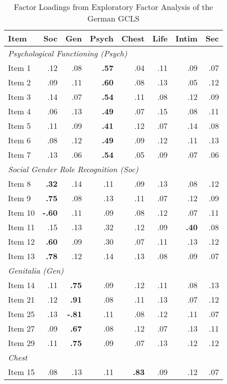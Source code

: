 \documentclass[12pt,a4paper]{article}
\begin{document}
\begin{table}[htbp]
\centering
\caption{Factor Loadings from Exploratory Factor Analysis of the German GCLS}
\begin{tabular}{lrrrrrrr}
\toprule
Item & Soc & Gen & Psych & Chest & Life & Intim & Sec\\
\midrule
\multicolumn{8}{l}{\textit{Psychological Functioning (Psych)}}\\
Item 1 & .12 & .08 & \textbf{.57} & .04 & .11 & .09 & .07\\
Item 2 & .09 & .11 & \textbf{.60} & .08 & .13 & .05 & .12\\
Item 3 & .14 & .07 & \textbf{.54} & .11 & .08 & .12 & .09\\
Item 4 & .06 & .13 & \textbf{.49} & .07 & .15 & .08 & .11\\
Item 5 & .11 & .09 & \textbf{.41} & .12 & .07 & .14 & .08\\
Item 6 & .08 & .12 & \textbf{.49} & .09 & .12 & .11 & .13\\
Item 7 & .13 & .06 & \textbf{.54} & .05 & .09 & .07 & .06\\
\midrule
\multicolumn{8}{l}{\textit{Social Gender Role Recognition (Soc)}}\\
Item 8 & \textbf{.32} & .14 & .11 & .09 & .13 & .08 & .12\\
Item 9 & \textbf{.75} & .08 & .13 & .11 & .07 & .12 & .09\\
Item 10 & \textbf{-.60} & .11 & .09 & .08 & .12 & .07 & .11\\
Item 11 & .15 & .13 & .32 & .12 & .09 & \textbf{.40} & .08\\
Item 12 & \textbf{.60} & .09 & .30 & .07 & .11 & .13 & .12\\
Item 13 & \textbf{.78} & .12 & .14 & .13 & .08 & .09 & .07\\
\midrule
\multicolumn{8}{l}{\textit{Genitalia (Gen)}}\\
Item 14 & .11 & \textbf{.75} & .09 & .12 & .11 & .08 & .13\\
Item 21 & .12 & \textbf{.91} & .08 & .11 & .13 & .07 & .12\\
Item 25 & .13 & \textbf{-.81} & .11 & .08 & .12 & .11 & .07\\
Item 27 & .09 & \textbf{.67} & .08 & .12 & .07 & .13 & .11\\
Item 29 & .11 & \textbf{.75} & .09 & .07 & .13 & .12 & .12\\
\midrule
\multicolumn{8}{l}{\textit{Chest}}\\
Item 15 & .08 & .13 & .11 & \textbf{.83} & .09 & .12 & .07\\

\end{tabular}
\end{table}
\end{document}
